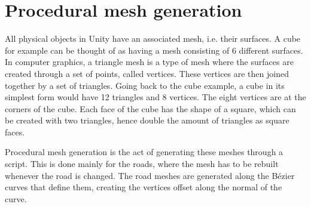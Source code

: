 \section{Procedural mesh generation}
    All physical objects in Unity have an associated mesh, i.e. their surfaces. A cube for example can be thought of as having a mesh consisting of 6 different surfaces. In computer graphics, a triangle mesh is a type of mesh where the surfaces are created through a set of points, called vertices. These vertices are then joined together by a set of triangles. Going back to the cube example, a cube in its simplest form would have 12 triangles and 8 vertices. The eight vertices are at the corners of the cube. Each face of the cube has the shape of a square, which can be created with two triangles, hence double the amount of triangles as square faces.

    Procedural mesh generation is the act of generating these meshes through a script. This is done mainly for the roads, where the mesh has to be rebuilt whenever the road is changed. The road meshes are generated along the Bézier curves that define them, creating the vertices offset along the normal of the curve.